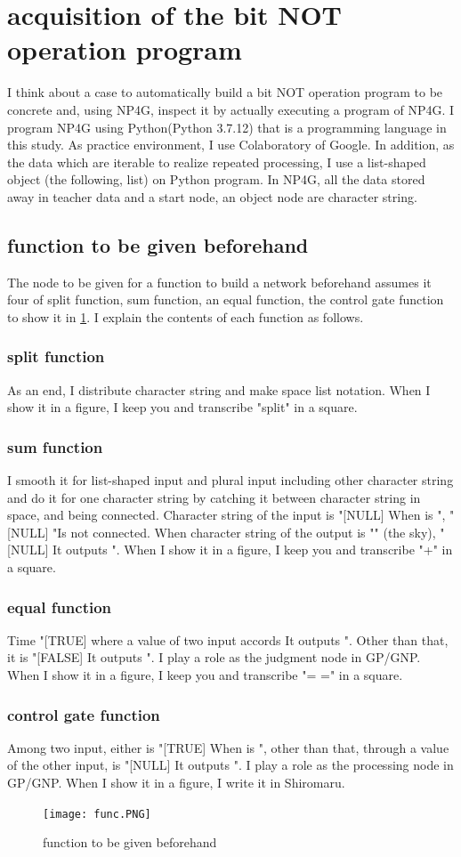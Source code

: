 \documentclass{article}
\begin{document}
\section {acquisition of the bit NOT operation program}
I think about a case to automatically build a bit NOT operation program to be concrete and, using NP4G, inspect it by actually executing a program of NP4G.
I program NP4G using Python(Python 3.7.12) that is a programming language in this study.
As practice environment, I use Colaboratory of Google.
In addition, as the data which are iterable to realize repeated processing, I use a list-shaped object (the following, list) on Python program.
In NP4G, all the data stored away in teacher data and a start node, an object node are character string.
\subsection {function to be given beforehand}
The node to be given for a function to build a network beforehand assumes it four of split function, sum function, an equal function, the control gate function to show it in \ref{fig:func}.
I explain the contents of each function as follows.
\subsubsection{split function}
As an end, I distribute character string and make space list notation.
When I show it in a figure, I keep you and transcribe "split" in a square.
\subsubsection{sum function}
I smooth it for list-shaped input and plural input including other character string and do it for one character string by catching it between character string in space, and being connected.
Character string of the input is "[NULL]
When is ", "[NULL]
"Is not connected.
When character string of the output is "" (the sky), "[NULL]
It outputs ".
When I show it in a figure, I keep you and transcribe "+" in a square.
\subsubsection {equal function}
Time "[TRUE] where a value of two input accords
It outputs ".
Other than that, it is "[FALSE]
It outputs ".
I play a role as the judgment node in GP/GNP.
When I show it in a figure, I keep you and transcribe "= =" in a square.
\subsubsection {control gate function}
Among two input, either is "[TRUE]
When is ", other than that, through a value of the other input, is "[NULL]
It outputs ".
I play a role as the processing node in GP/GNP.
When I show it in a figure, I write it in Shiromaru.
\begin{figure}[t]
\begin{center}
\texttt{[image: func.PNG]}
\end{center}
\caption {function to be given beforehand}
\label{fig:func}
\end{figure}
\end{document}
